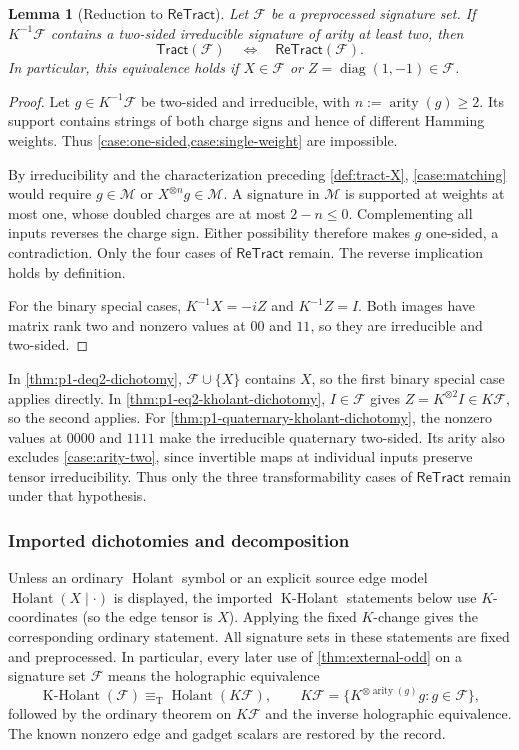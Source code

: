 \documentclass[11pt,letterpaper,onecolumn]{article}
\theoremstyle{plain}
\newtheorem{lemma}[lemma]{Lemma}
\theoremstyle{definition}
\theoremstyle{remark}
\newcommand{\cF}{\mathcal F}
\newcommand{\cM}{\mathscr M}
\newcommand{\Holant}{\operatorname{Holant}}
\newcommand{\KHolant}{\operatorname{K\text{-}Holant}}
\newcommand{\Tract}{\mathsf{Tract}}
\newcommand{\ReTract}{\mathsf{ReTract}}
\newcommand{\diag}{\operatorname{diag}}
\newcommand{\arity}{\operatorname{arity}}
\newcommand{\equivT}{\equiv_{\mathrm T}}
\begin{document}
\begin{lemma}[Reduction to \(\ReTract\)]
\label{lem:tract-X-anchor}
Let \(\cF\) be a preprocessed signature set. If \(K^{-1}\cF\) contains a
two-sided irreducible signature of arity at least two, then
\[
 \Tract(\cF)\quad\Longleftrightarrow\quad\ReTract(\cF).
\]
In particular, this equivalence holds if \(X\in\cF\) or
\(Z=\diag(1,-1)\in\cF\).
\end{lemma}

\begin{proof}
Let \(g\in K^{-1}\cF\) be two-sided and irreducible, with
\(n:=\arity(g)\ge2\). Its support contains strings of both charge signs
and hence of different Hamming weights. Thus
\cref{case:one-sided,case:single-weight} are impossible.

By irreducibility and the characterization preceding \cref{def:tract-X},
\cref{case:matching} would require \(g\in\cM\) or
\(X^{\otimes n}g\in\cM\). A signature in \(\cM\) is supported at
weights at most one, whose doubled charges are at most \(2-n\le0\).
Complementing all inputs reverses the charge sign. Either possibility
therefore makes \(g\) one-sided, a contradiction. Only the four cases
of \(\ReTract\) remain. The reverse implication holds by definition.

For the binary special cases, \(K^{-1}X=-iZ\) and \(K^{-1}Z=I\).
Both images have matrix rank two and nonzero values at \(00\) and \(11\),
so they are irreducible and two-sided.
\end{proof}

In \cref{thm:p1-deq2-dichotomy}, \(\cF\cup\{X\}\) contains \(X\), so the
first binary special case applies directly. In \cref{thm:p1-eq2-kholant-dichotomy},
\(I\in\cF\) gives \(Z=K^{\otimes2}I\in K\cF\), so the second applies.
For \cref{thm:p1-quaternary-kholant-dichotomy}, the nonzero values at
\(0000\) and \(1111\) make the irreducible quaternary two-sided.
Its arity also excludes \cref{case:arity-two}, since invertible maps at
individual inputs preserve tensor irreducibility. Thus only the three
transformability cases of \(\ReTract\) remain under that hypothesis.

\subsubsection{Imported dichotomies and decomposition}
\label{subsec:imported-results}

Unless an ordinary \(\Holant\) symbol or an explicit source edge model
\(\Holant(X\mid\cdot)\) is displayed, the imported \(\KHolant\) statements
below use \(K\)-coordinates (so the edge tensor is \(X\)). Applying
the fixed \(K\)-change gives the corresponding ordinary statement.  All
signature sets in these statements are fixed and preprocessed.
In particular, every later use of \cref{thm:external-odd} on a signature set
\(\cF\) means the holographic equivalence
\[
 \KHolant(\cF)\equivT\Holant(K\cF),
 \qquad
 K\cF=\{K^{\otimes\arity(g)}g:g\in\cF\},
\]
followed by the ordinary theorem on \(K\cF\) and the inverse holographic equivalence.
The known nonzero edge and gadget scalars are restored by the record.
\end{document}
